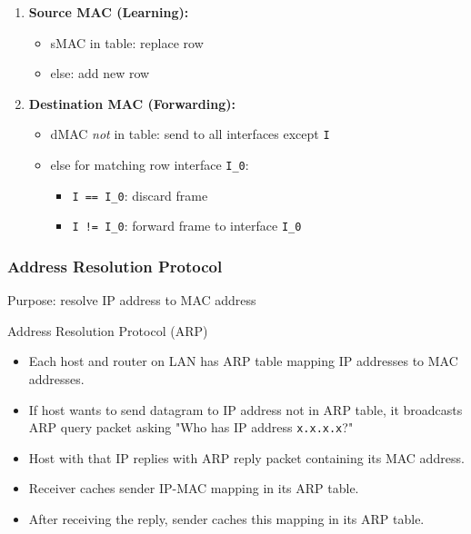 \begin{definition}
    \begin{enumerate}
        \item \textbf{Source MAC (Learning):}
              \begin{itemize}
                  \item sMAC in table: replace row
                  \item else: add new row
              \end{itemize}
        \item \textbf{Destination MAC (Forwarding):}
              \begin{itemize}
                  \item dMAC \textit{not} in table: send to all interfaces except \texttt{I}
                  \item else for matching row interface \texttt{I\_0}:
                        \begin{itemize}
                            \item \texttt{I == I\_0}: discard frame
                            \item \texttt{I != I\_0}: forward frame to interface \texttt{I\_0}
                        \end{itemize}
              \end{itemize}
    \end{enumerate}

\end{definition}

\subsubsection{Address Resolution Protocol}

Purpose: resolve IP address to MAC address

\begin{definition}
    {Address Resolution Protocol (ARP)}
    \begin{itemize}
        \item Each host and router on LAN has ARP table mapping IP addresses to MAC addresses.
        \item If host wants to send datagram to IP address not in ARP table, it broadcasts ARP query packet asking "Who has IP address \texttt{x.x.x.x}?"
        \item Host with that IP replies with ARP reply packet containing its MAC address.
        \item Receiver caches sender IP-MAC mapping in its ARP table.
        \item After receiving the reply, sender caches this mapping in its ARP table.
    \end{itemize}
\end{definition}

